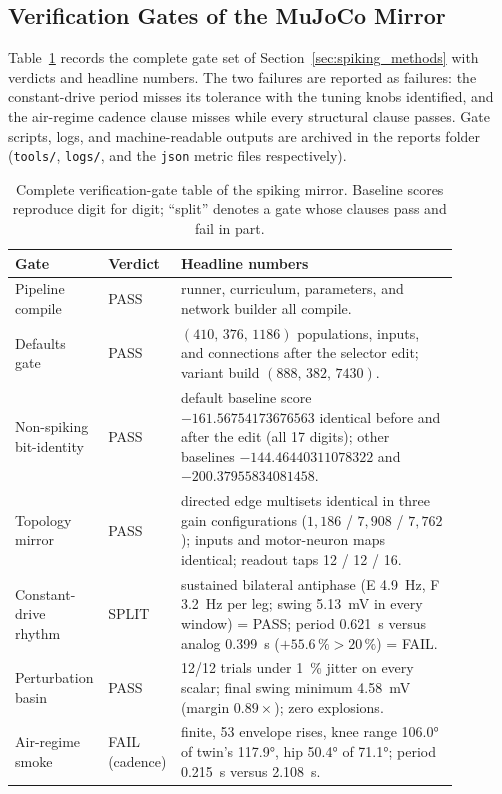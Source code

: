 \subsection{Verification Gates of the MuJoCo Mirror}

Table~\ref{tab:app_spk_gates} records the complete gate set of Section~\ref{sec:spiking_methods} with verdicts and headline numbers. The two failures are reported as failures: the constant-drive period misses its tolerance with the tuning knobs identified, and the air-regime cadence clause misses while every structural clause passes. Gate scripts, logs, and machine-readable outputs are archived in the reports folder (\texttt{tools/}, \texttt{logs/}, and the \texttt{json} metric files respectively).

\begin{table}
\caption{Complete verification-gate table of the spiking mirror. Baseline scores reproduce digit for digit; ``split'' denotes a gate whose clauses pass and fail in part.}
\label{tab:app_spk_gates}
\begin{tabular}{@{}p{0.16\linewidth}p{0.10\linewidth}p{0.62\linewidth}@{}}
\toprule
\textbf{Gate} & \textbf{Verdict} & \textbf{Headline numbers} \\
\midrule
Pipeline compile & PASS & runner, curriculum, parameters, and network builder all compile. \\
Defaults gate & PASS & $(410,\,376,\,1186)$ populations, inputs, and connections after the selector edit; variant build $(888,\,382,\,7430)$. \\
Non-spiking bit-identity & PASS & default baseline score $-161.56754173676563$ identical before and after the edit (all 17 digits); other baselines $-144.46440311078322$ and $-200.37955834081458$. \\
Topology mirror & PASS & directed edge multisets identical in three gain configurations ($1{,}186$ / $7{,}908$ / $7{,}762$); inputs and motor-neuron maps identical; readout taps 12 / 12 / 16. \\
Constant-drive rhythm & SPLIT & sustained bilateral antiphase (E \qty{4.9}{\hertz}, F \qty{3.2}{\hertz} per leg; swing \qty{5.13}{\mV} in every window) = PASS; period \qty{0.621}{\second} versus analog \qty{0.399}{\second} ($+55.6\,\% > 20\,\%$) = FAIL. \\
Perturbation basin & PASS & 12/12 trials under \qty{1}{\percent} jitter on every scalar; final swing minimum \qty{4.58}{\mV} (margin $0.89\times$); zero explosions. \\
Air-regime smoke & FAIL (cadence) & finite, 53 envelope rises, knee range \ang{106.0} of twin's \ang{117.9}, hip \ang{50.4} of \ang{71.1}; period \qty{0.215}{\second} versus \qty{2.108}{\second}. \\

\end{tabular}
\end{table}

